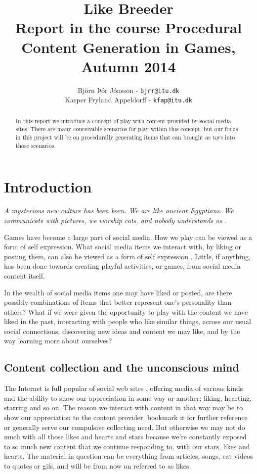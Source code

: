 \documentclass[]{article}
\title{Like Breeder\\ \small Report in the course Procedural Content Generation in Games, Autumn 2014}
\author{Björn Þór Jónsson - \texttt{bjrr@itu.dk}\\Kasper Fryland Appeldorff - \texttt{kfap@itu.dk}}
\begin{document}

\maketitle
\listoftodos %
\newpage
\begin{abstract}
In this report we introduce a concept of play with content provided by social media sites.  There are many conceivable scenarios for play within this concept, but our focus in this project will be on procedurally generating items that can brought as toys into those scenarios.
\end{abstract}



\section{Introduction}
\label{sec:Introduction}

\begin{center}
\textit{A mysterious new culture has been born. We are like ancient Egyptians. We communicate with pictures, we worship cats, and nobody understands us} \cite{gross2013makes}.
\end{center}


Games have become a large part of social media.  How we play can be viewed as a form of self expression.  What social media items we interact with, by liking or posting them, can also be viewed as a form of self expression \cite{bargh2002can}.  Little, if anything, has been done towards creating playful activities, or games, from social media content itself.

In the wealth of social media items one may have liked or posted, are there possibly
combinations of items that better represent one's personality than others?  What if we were given the opportunity to play with the content we have liked in the past, interacting with people who like similar things, across our usual social connections, discovering new ideas and content we may like, and by the way learning more about ourselves?


\subsection{Content collection and the unconscious mind}

The Internet is full popular of social web sites \cite{LeadingSocialNetworks}, offering media of various kinds and the ability to show our appreciation in some way or another; liking, hearting, starring and so on.  The reason we interact with content in that way may be to show our appreciation to the content provider, bookmark it for further reference or generally serve our compulsive collecting need.  But otherwise we may not do much with all those likes and hearts and stars because we're constantly exposed to so much new content that we continue responding to, with our stars, likes and hearts.  The material in question can be everything from articles, songs, cat videos to quotes or gifs, and will be from now on referred to as likes.
\end{document}
